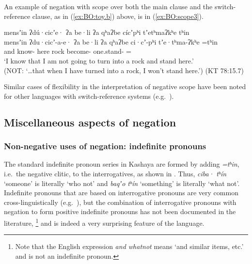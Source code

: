 \documentclass[output=paper,modfonts,nonflat,colorlinks,citecolor=brown]{langscibook}
\begin{document}
An example of negation with scope over both the main clause and the switch-reference clause, as in (\ref{ex:BO:toy.b}) above, is in (\ref{ex:BO:scope3}).

\ea 
\label{ex:BO:scope3}
\glll mensʼin ʔdú·cicʼe· ʔa be·li ʔa qʰaʔbe cícʼpʰi tʼetʰmaʔkʰe tʰin\\
    mensʼin ʔdu·cicʼ-a-e· ʔa be·li ʔa qʰaʔbe ci·cʼ-pʰi tʼe·tʰma-ʔkʰe =tʰin\\
    and know-  here  rock become- one.stand- =\\
\glt `I know that I am not going to turn into a rock and stand here.' \\
(NOT: `\ldots that when I have turned into a rock, I won't stand here.') ({KT 78:15.7})\\
\z

Similar cases of flexibility in the interpretation of negative scope have been noted for other languages with switch-reference systems (e.g.\ \citealt[258--259]{Reesink2002}).

\subsection{Miscellaneous aspects of negation}
\subsubsection{Non-negative uses of negation: indefinite pronouns} 
\label{sec:BO:indef}

The standard indefinite pronoun series in Kashaya are formed by adding \textit{=tʰin}, i.e.\ the negative clitic, to the interrogatives, as shown in . Thus, \textit{ciba· tʰín} `someone' is literally `who not' and \textit{baqʼo tʰín} `something' is literally `what not'.
Indefinite pronouns that are based on interrogative pronouns are very common cross-linguistically (e.g.\ \citealt{Haspelmath1997}), but the combination of interrogative pronouns with negation to form positive indefinite pronouns has not been documented in the literature,%
\footnote{%
Note that the English expression \textit{and whatnot} means `and similar items, etc.' and is not an indefinite pronoun.
} %
and is indeed a very surprising feature of the language.%
\end{document}
